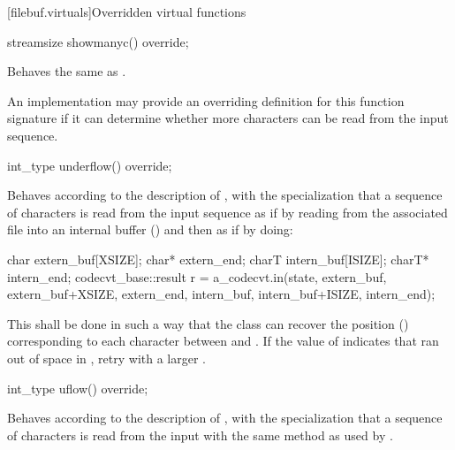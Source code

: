 [filebuf.virtuals]{Overridden virtual functions}

%
\begin{itemdecl}
streamsize showmanyc() override;
\end{itemdecl}

\begin{itemdescr}
\pnum
\effects
Behaves the same as
.
%

\pnum
\remarks
An
implementation may provide an overriding definition for this function
signature if it can determine whether more characters can be read from the input
sequence.
\end{itemdescr}

%
\begin{itemdecl}
int_type underflow() override;
\end{itemdecl}

\begin{itemdescr}
\pnum
\effects
Behaves according to the description of
,
with the specialization that a sequence of characters is read from the input
sequence as if by reading from the associated file
into an internal buffer ()
and then as if by doing:

\begin{codeblock}
char   extern_buf[XSIZE];
char*  extern_end;
charT  intern_buf[ISIZE];
charT* intern_end;
codecvt_base::result r =
  a_codecvt.in(state, extern_buf, extern_buf+XSIZE, extern_end,
               intern_buf, intern_buf+ISIZE, intern_end);
\end{codeblock}

This shall be done in such a way that the class can recover the
position
()
corresponding to each character between
and
.
If the value of
indicates that
ran out of space in
,
retry with a larger
.
\end{itemdescr}

%
\begin{itemdecl}
int_type uflow() override;
\end{itemdecl}

\begin{itemdescr}
\pnum
\effects
Behaves according to the description of
,
with the specialization that a sequence of characters is read from the input
with the same method as used by
.
\end{itemdescr}

